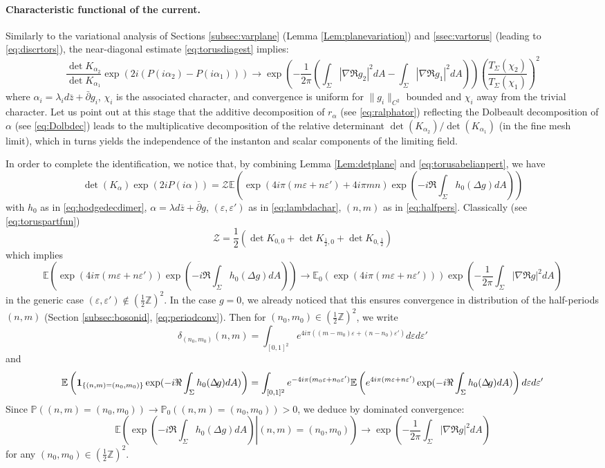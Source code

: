 \documentclass[10pt]{article}
\newcommand{\Z}{\mathbb{Z}}
\newcommand{\E}{\mathbb{E}}
\newcommand{\mc}{\mathcal}
\newcommand{\eps}{\varepsilon}
\newcommand{\ind}{{\bf 1}}
\renewcommand{\P}{\mathbb{P}}
\newcommand{\Lap}{\Delta\!}
\newcommand{\dbar}{\bar\partial}
\begin{document}
\paragraph{Characteristic functional of the current.\\}

Similarly to the variational analysis of Sections \ref{subsec:varplane} (Lemma \ref{Lem:planevariation}) and \ref{ssec:vartorus} (leading to \eqref{eq:discrtors}), the near-diagonal estimate \eqref{eq:torusdiagest} implies:
$$\frac{\det{K_{\alpha_2}}}{\det{K_{\alpha_1}}}\exp(2i(P(i\alpha_2)-P(i\alpha_1)))\longrightarrow
\exp\left(-\frac 1{2\pi}\left(\int_\Sigma |\nabla\Re g_2|^2dA-\int_\Sigma |\nabla\Re g_1|^2dA\right)\right)
\left(\frac{T_\Sigma(\chi_2)}{T_\Sigma(\chi_1)}\right)^2$$
where $\alpha_i=\lambda_id\bar z+\dbar g_i$, $\chi_i$ is the associated character, and convergence is uniform for $\|g_i\|_{C^2}$ bounded and $\chi_i$ away from the trivial character. Let us point out at this stage that the additive decomposition of $r_\alpha$ (see \ref{eq:ralphator}) reflecting the Dolbeault decomposition of $\alpha$ (see \ref{eq:Dolbdec}) leads to the multiplicative decomposition of the relative determinant $\det(K_{\alpha_2})/\det(K_{\alpha_1})$ (in the fine mesh limit), which in turns yields the independence of the instanton and scalar components of the limiting field.

In order to complete the identification, we notice that, by combining Lemma \ref{Lem:detplane} and \eqref{eq:torusabelianpert}, we have
$$\det(K_\alpha)\exp(2iP(i\alpha))={\mc Z}\E\left(\exp(4i\pi(m\eps+n\eps')+4i\pi mn)\exp(-i\Re\int_\Sigma h_0(\Lap g)dA)\right)$$
with $h_0$ as in \eqref{eq:hodgedecdimer}, $\alpha=\lambda d\bar z+\dbar g$, $(\eps,\eps')$ as in \eqref{eq:lambdachar}, $(n,m)$ as in \eqref{eq:halfpers}. Classically (see \eqref{eq:toruspartfun})
$${\mc Z}=\frac 12(\det K_{0,0}+\det K_{\frac 12,0}+\det K_{0,\frac 12})$$
which implies
$$\E\left(\exp(4i\pi(m\eps+n\eps'))\exp(-i\Re\int_\Sigma h_0(\Lap g)dA)\right)\longrightarrow\E_0\left(\exp(4i\pi(m\eps+n\eps'))\right)\exp\left(
-\frac 1{2\pi}\int_\Sigma |\nabla\Re g|^2dA\right)$$
in the generic case $(\eps,\eps')\notin(\frac 12\Z)^2$. In the case $g=0$, we already noticed that this ensures convergence in distribution of the half-periods $(n,m)$ (Section \ref{subsec:bosonid}, \eqref{eq:periodconv}). Then for $(n_0,m_0)\in (\frac 12\Z)^2$, we write
$$\delta_{(n_0,m_0)}(n,m)=\int_{[0,1]^2}e^{4i\pi((m-m_0)\eps+(n-n_0)\eps')}d\eps d\eps'$$
and 
$$\E\left(\ind_{\{(n,m)=(n_0,m_0)\}}\exp(-i\Re\int_\Sigma h_0(\Lap g)dA)\right)=\int_{[0,1]^2}e^{-4i\pi(m_0\eps+n_0\eps')} 
\E\left(e^{4i\pi(m\eps+n\eps')}\exp(-i\Re\int_\Sigma h_0(\Lap g)dA)\right)d\eps d\eps'
$$
Since $\P((n,m)=(n_0,m_0))\rightarrow\P_0((n,m)=(n_0,m_0))>0$, we deduce by dominated convergence:
\begin{equation}\label{eq:fluctcondtor}
\E\left(\left.\exp(-i\Re\int_\Sigma h_0(\Lap g)dA)\right|(n,m)=(n_0,m_0)\right)\longrightarrow \exp\left(
-\frac 1{2\pi}\int_\Sigma |\nabla\Re g|^2dA\right)
\end{equation}
for any $(n_0,m_0)\in (\frac 12\Z)^2$.
\end{document}
